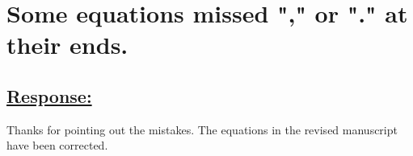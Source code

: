 \section{Some equations missed "," or "." at their ends.}
\subsection*{\underline{\textbf{Response:}}}

Thanks for pointing out the mistakes.
The equations in the revised manuscript have been corrected.


